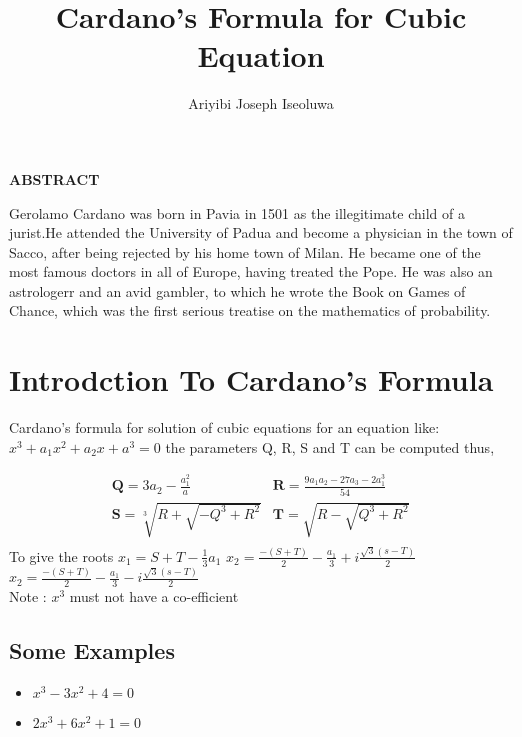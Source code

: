 \documentclass{article}
\title{Cardano's Formula for Cubic Equation}
\author{Ariyibi Joseph Iseoluwa}
\begin{document}
	\maketitle
	\begin{center}
		\textbf{ABSTRACT}
	\end{center}
Gerolamo Cardano was born in Pavia in 1501 as the illegitimate child of a jurist.He attended the University of Padua and become a physician in the town of Sacco, after being rejected by his home town of Milan. He became one of the most famous doctors in all of Europe, having treated the Pope. He was also an astrologerr and an avid gambler, to which he wrote the Book on Games of Chance, which was the first serious treatise on the mathematics of probability.\cite{ Ariyibi2021}
\section{Introdction To Cardano's Formula}
Cardano's formula for solution of cubic equations for an equation like: $x^3 + a_1x^2 + a_2x + a^3 = 0$
the parameters Q, R, S and T can be computed thus,\\
\raggedright
	\begin{align}
		\textbf{Q}= 3a_2 - \frac{a_1^2}{a} &                       \textbf{R}= \frac{9a_1a_2-27a_3-2a_1^3}{54} \\
		\textbf{S} =\sqrt[3]{R + \sqrt{-Q^3 + R^2}} & 
		 \textbf{T} = \sqrt{R - \sqrt{Q^3 + R^2}} \\
	\end{align}
To give the roots
$x_1= S + T-\frac{1}{3}a_1$
$x_2= \frac{-(S+T)}{2} - \frac{a_1}{3} + i\frac{\sqrt{3}(s-T)}{2}$ \\
$x_2= \frac{-(S+T)}{2} - \frac{a_1}{3} - i\frac{\sqrt{3}(s-T)}{2}$ \\


Note : $x^3$ must not have a co-efficient
\subsection{Some Examples}
\begin{itemize}
	\item  $x^3 - 3x^2 + 4 = 0$
	\item $2x^3 + 6x^2 + 1 = 0$
\end{itemize}
\end{document}
